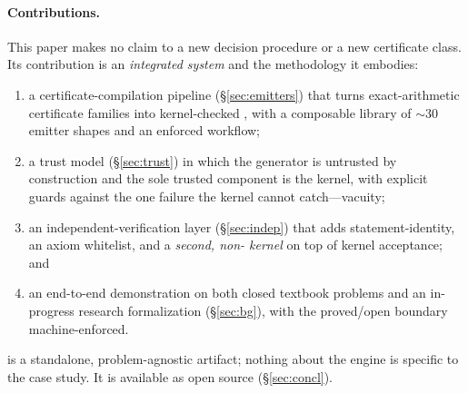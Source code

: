 \paragraph{Contributions.} This paper makes no claim to a new decision procedure
or a new certificate class. Its contribution is an \emph{integrated system} and
the methodology it embodies:
\begin{enumerate}[nosep,leftmargin=1.4em]
  \item a certificate-compilation pipeline (\S\ref{sec:emitters}) that turns
    exact-arithmetic certificate families into kernel-checked \Lean, with a
    composable library of $\sim$30 emitter shapes and an enforced
     workflow;
  \item a trust model (\S\ref{sec:trust}) in which the generator is untrusted by
    construction and the sole trusted component is the kernel, with explicit
    guards against the one failure the kernel cannot catch---vacuity;
  \item an independent-verification layer (\S\ref{sec:indep}) that adds
    statement-identity, an axiom whitelist, and a \emph{second, non-\Lean{}
    kernel} on top of kernel acceptance; and
  \item an end-to-end demonstration on both closed textbook problems and an
    in-progress research formalization (\S\ref{sec:bg}), with the proved/open
    boundary machine-enforced.
\end{enumerate}
\Telperion{} is a standalone, problem-agnostic artifact; nothing about the engine
is specific to the case study. It is available as open source (\S\ref{sec:concl}).
